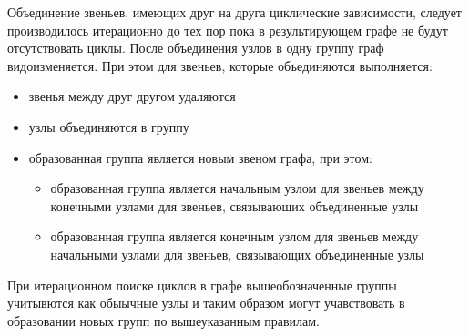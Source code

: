 

Объединение звеньев, имеющих друг на друга циклические зависимости, следует производилось итерационно до тех пор пока в результирующем графе не будут отсутствовать циклы. После объединения узлов в одну группу граф видоизменяется. При этом для звеньев, которые объединяются выполняется:
\begin{itemize}
	\item звенья между друг другом удаляются
	\item узлы объединяются в группу
	\item образованная группа является новым звеном графа, при этом:
	\begin{itemize}
		\item образованная группа является начальным узлом для звеньев между конечными узлами для звеньев, связывающих объединенные узлы
		\item образованная группа является конечным узлом для звеньев между начальными узлами для звеньев, связывающих объединенные узлы
	\end{itemize}
\end{itemize}

При итерационном поиске циклов в графе вышеобозначенные группы учитывются как обыычные узлы и таким образом могут учавствовать в образовании новых групп по вышеуказанным правилам.